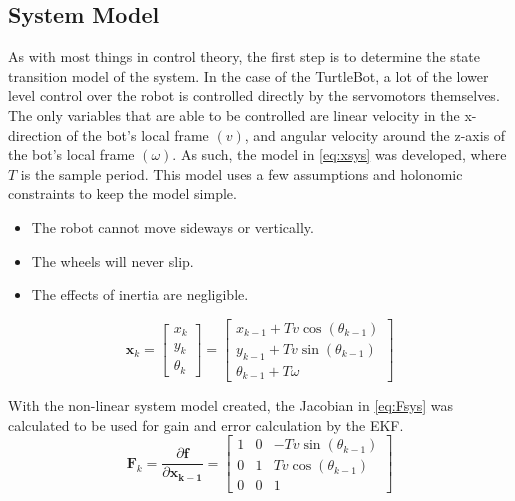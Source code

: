 \subsection{System Model}
	As with most things in control theory, the first step is to determine the state transition model of the system. In the case of the TurtleBot, a lot of the lower level control over the robot is controlled directly by the servomotors themselves. The only variables that are able to be controlled are linear velocity in the x-direction of the bot's local frame $\left(v\right)$, and angular velocity around the z-axis of the bot's local frame $\left(\omega\right)$. As such, the model in \ref{eq:xsys} was developed, where $T$ is the sample period. This model uses a few assumptions and holonomic constraints to keep the model simple.\par
	\begin{itemize}
		\item The robot cannot move sideways or vertically.
		\item The wheels will never slip.
		\item The effects of inertia are negligible.
	\end{itemize}

	\begin{equation}
	\label{eq:xsys}
		\boldsymbol{x}_{ k} = 
		\begin{bmatrix}
			x _{ k}	\\
			y_{ k}		\\
			\theta_{ k}
		\end{bmatrix}
		=
		\begin{bmatrix}
			x_{k-1}+Tv\cos{\left(\theta_{k-1}\right)}								\\
			y_{k-1}+Tv\sin{\left(\theta_{k-1}\right)}								\\
			\theta_{k-1} + T\omega
		\end{bmatrix}
	\end{equation}
	
	With the non-linear system model created, the Jacobian in \ref{eq:Fsys} was calculated to be used for gain and error calculation by the EKF.
	\begin{equation}
	\label{eq:Fsys}
		\boldsymbol{F}_{k} = \frac{\partial\boldsymbol{f}}{\partial\boldsymbol{x_{k-1}}}
		=
		\begin{bmatrix}
			1	&0	&-Tv\sin{\left(\theta_{k-1}\right)}	\\
			0	&1	&Tv\cos{\left(\theta_{k-1}\right)}	\\
			0	&0	&1
		\end{bmatrix}
	\end{equation}

